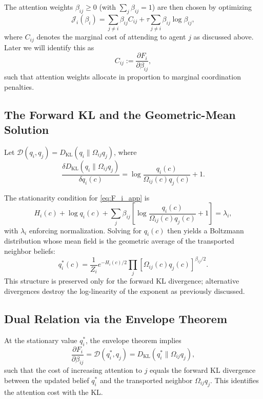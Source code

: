 \documentclass[11pt]{article}
\begin{document}
The attention weights $\beta_{ij}\ge 0$ (with $\sum_j \beta_{ij}=1$) are then chosen by optimizing
\begin{equation}
\mathcal{J}_i(\beta_i)
=\sum_{j\neq i}\beta_{ij} C_{ij}
+ \tau \sum_{j\neq i}\beta_{ij}\log\beta_{ij},
\end{equation}
where $C_{ij}$ denotes the marginal cost of attending to agent $j$ as discussed above. Later we will identify this as
\begin{equation}
C_{ij} := \frac{\partial F_i}{\partial \beta_{ij}},
\end{equation}
such that attention weights allocate in proportion to marginal coordination penalties.

\subsection*{The Forward KL and the Geometric-Mean Solution}

Let $\mathcal{D}(q_i,q_j) = D_{\mathrm{KL}}(q_i \| \Omega_{ij} q_j)$, where
\[
\frac{\delta D_{\mathrm{KL}}(q_i \| \Omega_{ij} q_j)}{\delta q_i(c)}
= \log\frac{q_i(c)}{\Omega_{ij}(c) q_j(c)} + 1.
\]

The stationarity condition for \eqref{eq:F_i_app} is
\begin{equation}
H_i(c)
+ \log q_i(c)
+ \sum_j \beta_{ij}
\left[
\log\frac{q_i(c)}{\Omega_{ij}(c)q_j(c)}+1
\right]
= \lambda_i,
\end{equation}
with $\lambda_i$ enforcing normalization. Solving for $q_i(c)$ then yields a Boltzmann distribution whose mean field is the geometric average of the transported neighbor beliefs:
\begin{equation}
q_i^*(c)
= \frac{1}{Z_i}
e^{-H_i(c)/2}
\prod_j
[\Omega_{ij}(c) q_j(c)]^{\beta_{ij}/2}.
\end{equation}
This structure is preserved only for the forward KL divergence; alternative divergences destroy the log-linearity of the exponent as previously discussed.

\subsection*{Dual Relation via the Envelope Theorem}

At the stationary value $q_i^*$, the envelope theorem implies
\begin{equation}
\frac{\partial F_i}{\partial \beta_{ij}}
= \mathcal{D}(q_i^*, q_j)
= D_{\mathrm{KL}}(q_i^* \| \Omega_{ij} q_j),
\end{equation}
such that the cost of increasing attention to $j$ equals the forward KL divergence between the updated belief $q_i^*$ and the transported neighbor $\Omega_{ij} q_j$. This identifies the attention cost with the KL.
\end{document}
